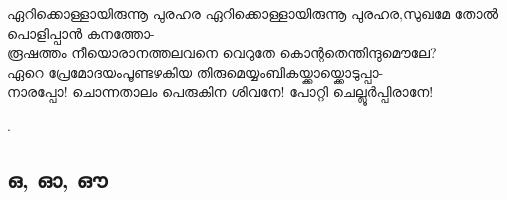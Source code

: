 \begin{enumerate}



\begin{slokam}{\VSr}{\Unk}{ഏറിക്കൊള്ളായിരുന്നൂ പുരഹര}
ഏറിക്കൊള്ളായിരുന്നൂ പുരഹര,സുഖമേ തോല്‍ പൊളിപ്പാന്‍ കനത്തോ-\\
രൂഷത്തം നീയൊരാനത്തലവനെ വെറുതേ കൊന്റതെന്തിന്ദുമൌലേ?\\
ഏറെ പ്രേമോദയംപൂണ്ടഴകിയ തിരുമെയ്യംബികയ്ക്കായ്ക്കൊടുപ്പാ-\\
നാരപ്പോ! ചൊന്നതാലം പെരുകിന ശിവനേ! പോറ്റി ചെല്ലൂര്‍പ്പിരാനേ!
\end{slokam}


. 

\end{enumerate}

\subsection{ഒ, ഓ, ഔ}


